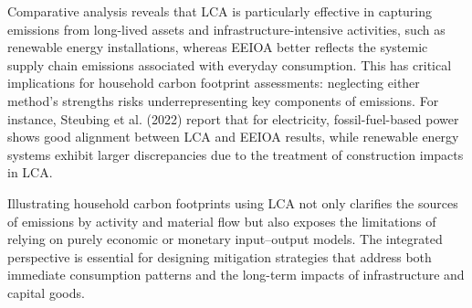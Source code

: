 \documentclass[12pt,a4paper]{article}
\begin{document}
Comparative analysis reveals that LCA is particularly effective in capturing emissions from long-lived assets and infrastructure-intensive activities, such as renewable energy installations, whereas EEIOA better reflects the systemic supply chain emissions associated with everyday consumption. This has critical implications for household carbon footprint assessments: neglecting either method's strengths risks underrepresenting key components of emissions. For instance, Steubing et al. (2022) report that for electricity, fossil-fuel-based power shows good alignment between LCA and EEIOA results, while renewable energy systems exhibit larger discrepancies due to the treatment of construction impacts in LCA.

Illustrating household carbon footprints using LCA not only clarifies the sources of emissions by activity and material flow but also exposes the limitations of relying on purely economic or monetary input--output models. The integrated perspective is essential for designing mitigation strategies that address both immediate consumption patterns and the long-term impacts of infrastructure and capital goods.
\end{document}
